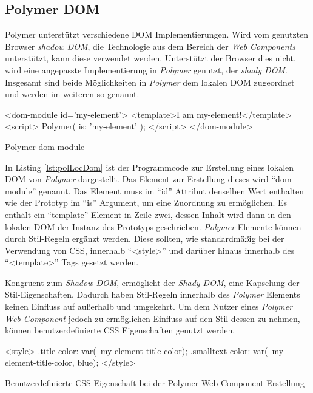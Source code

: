 \documentclass[12pt, paper=a4, bibtotoc, toc=listof, headsepline=true]{scrreprt}
\begin{document}
\subsection{Polymer DOM}
Polymer unterstützt verschiedene \ac{DOM} Implementierungen. Wird vom genutzten Browser \emph{shadow DOM}, die Technologie aus dem Bereich der \emph{Web Components} unterstützt, kann diese verwendet werden. Unterstützt der Browser dies nicht, wird eine angepasste Implementierung in \emph{Polymer} genutzt, der \emph{shady DOM}. Insgesamt sind beide Möglichkeiten in \emph{Polymer} dem lokalen \ac{DOM} zugeordnet und werden im weiteren so genannt.\cite[vgl.]{polLocDom}
\begin{listing}
	\begin{HTMLcode*}{}
<dom-module id='my-element'>
   <template>I am my-element!</template>
   <script>
      Polymer({
      is: 'my-element'
      });
   </script>
</dom-module>
	\end{HTMLcode*}
	\caption{Polymer dom-module}
	\label{lst:polLocDom}
\end{listing}
In Listing \ref{lst:polLocDom} ist der Programmcode zur Erstellung eines lokalen \ac{DOM} von \emph{Polymer} dargestellt. Das Element zur Erstellung dieses wird \enquote{dom-module} genannt. Das Element muss im \enquote{id} Attribut denselben Wert enthalten wie der Prototyp im \enquote{is} Argument, um eine Zuordnung zu ermöglichen. Es enthält ein \enquote{template} Element in Zeile zwei, dessen Inhalt wird dann in den lokalen \ac{DOM} der Instanz des Prototyps geschrieben. \newline
\emph{Polymer} Elemente können durch Stil-Regeln ergänzt werden. Diese sollten, wie standardmäßig bei der Verwendung von \ac{CSS}, innerhalb \enquote{<style>} und darüber hinaus innerhalb des \enquote{<template>} Tags gesetzt werden.

\newline
Kongruent zum \emph{Shadow DOM}, ermöglicht der \emph{Shady DOM}, eine Kapselung der Stil-Eigenschaften. Dadurch haben Stil-Regeln innerhalb des \emph{Polymer} Elements keinen Einfluss auf außerhalb und umgekehrt. Um dem Nutzer eines \emph{Polymer} \emph{Web Component} jedoch zu ermöglichen Einfluss auf den Stil dessen zu nehmen, können benutzerdefinierte \ac{CSS} Eigenschaften genutzt werden.\cite{polStyLocDom}
\begin{listing}
	\begin{HTMLcode*}{}
<style>
.title {
	color: var(--my-element-title-color);
}
.smalltext {
	color: var(--my-element-title-color, blue);
}
</style>
	\end{HTMLcode*}
	\caption{Benutzerdefinierte CSS Eigenschaft bei der Polymer Web Component Erstellung}
	\label{lst:benCss}
\end{listing}
\end{document}

